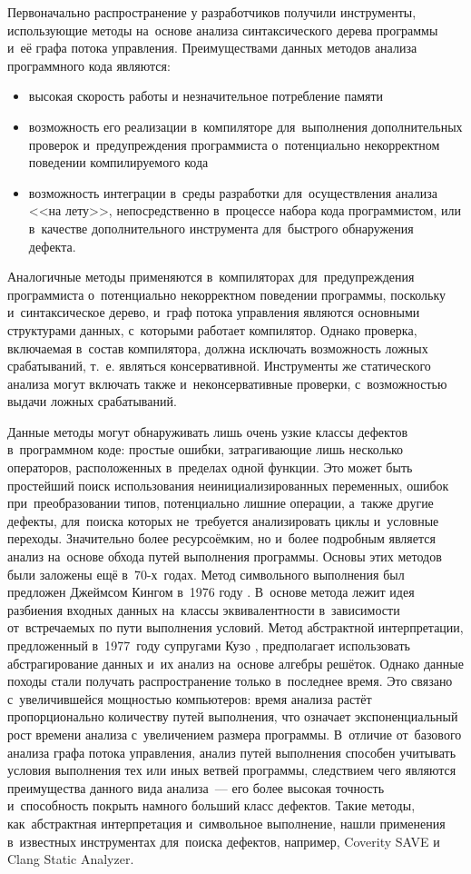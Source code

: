Первоначально распространение у разработчиков получили инструменты, использующие методы на~основе анализа синтаксического дерева программы и~её графа потока управления. Преимуществами данных методов анализа программного кода являются:

\begin{itemize}
 \item высокая скорость работы и незначительное потребление памяти
 \item возможность его реализации в~компиляторе для~выполнения дополнительных проверок и~предупреждения программиста о~потенциально некорректном поведении компилируемого кода
 \item возможность интеграции в~среды разработки для~осуществления анализа <<на лету>>, непосредственно в~процессе набора кода программистом, или в~качестве дополнительного инструмента для~быстрого обнаружения дефекта.
\end{itemize}

Аналогичные методы применяются в~компиляторах для~предупреждения программиста о~потенциально некорректном поведении программы, поскольку и~синтаксическое дерево, и~граф потока управления являются основными структурами данных, с~которыми работает компилятор. Однако проверка, включаемая в~состав компилятора, должна исключать возможность ложных срабатываний, т.~е. являться консервативной. Инструменты же статического анализа могут включать также и~неконсервативные проверки, с~возможностью выдачи ложных срабатываний.

Данные методы могут обнаруживать лишь очень узкие классы дефектов в~программном коде: простые ошибки, затрагивающие лишь несколько операторов, расположенных в~пределах одной функции. Это может быть простейший поиск использования неинициализированных переменных, ошибок при~преобразовании типов, потенциально лишние операции, а~также другие дефекты, для~поиска которых не~требуется анализировать циклы и~условные переходы. Значительно более ресурсоёмким, но и~более подробным является анализ на~основе обхода путей выполнения программы. Основы этих методов были заложены ещё в~70-х~годах. Метод символьного выполнения был предложен Джеймсом Кингом в~1976 году \cite{king76}. В~основе метода лежит идея разбиения входных данных на~классы эквивалентности в~зависимости от~встречаемых по пути выполнения условий. Метод абстрактной интерпретации, предложенный в~1977~году супругами Кузо \cite{cousot}, предполагает использовать абстрагирование данных и~их анализ на~основе алгебры решёток. Однако данные походы стали получать распространение только в~последнее время. Это связано с~увеличившейся мощностью компьютеров: время анализа растёт пропорционально количеству путей выполнения, что означает экспоненциальный рост времени анализа с~увеличением размера программы. В~отличие от~базового анализа графа потока управления, анализ путей выполнения способен учитывать условия выполнения тех или иных ветвей программы,  следствием чего являются преимущества данного вида анализа~--- его более высокая точность и~способность покрыть намного больший класс дефектов. Такие методы, как~абстрактная интерпретация и~символьное выполнение, нашли применения в~известных инструментах для~поиска дефектов, например, Coverity SAVE и Clang Static Analyzer.


